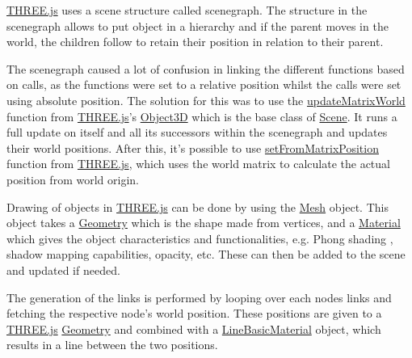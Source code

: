 



\href{https://threejs.org/}{THREE.js} uses a scene structure called \gls{scenegraph}. The structure in the \gls{scenegraph} allows to put object in a hierarchy and if the parent moves in the world, the children follow to retain their position in relation to their parent. 

The \gls{scenegraph} caused a lot of confusion in linking the different functions based on calls, as the functions were set to a relative position whilst the calls were set using absolute position. The solution for this was to use the \href{https://threejs.org/docs/#api/en/core/Object3D.updateMatrixWorld}{updateMatrixWorld} function from \href{https://threejs.org/}{THREE.js}'s \href{https://threejs.org/docs/#api/en/core/Object3D}{Object3D} which is the base class of \href{https://threejs.org/docs/#api/en/scenes/Scene}{Scene}. It runs a full update on itself and all its successors within the \gls{scenegraph} and updates their world positions. After this, it's possible to use \href{https://threejs.org/docs/#api/en/math/Vector3.setFromMatrixPosition}{setFromMatrixPosition} function from \href{https://threejs.org/}{THREE.js}, which uses the world matrix to calculate the actual position from world origin. 

Drawing of objects in \href{https://threejs.org/}{THREE.js} can be done by using the \href{https://threejs.org/docs/#api/en/objects/Mesh}{Mesh} object. This object takes a \href{https://threejs.org/docs/#api/en/core/Geometry}{Geometry} which is the shape made from vertices, and a \href{https://threejs.org/docs/#api/en/materials/Material}{Material} which gives the object characteristics and functionalities, e.g. Phong shading \cite{acm:phongShading1986article}, shadow mapping \cite{acm:perspectiveShadowMap2002article} capabilities, opacity, etc. These can then be added to the scene and updated if needed. 

The generation of the links is performed by looping over each nodes links and fetching the respective node's world position. These positions are given to a \href{https://threejs.org/}{THREE.js} \href{https://threejs.org/docs/#api/en/core/Geometry}{Geometry} and combined with a \href{https://threejs.org/docs/#api/en/materials/LineBasicMaterial}{LineBasicMaterial} object, which results in a line between the two positions. %

